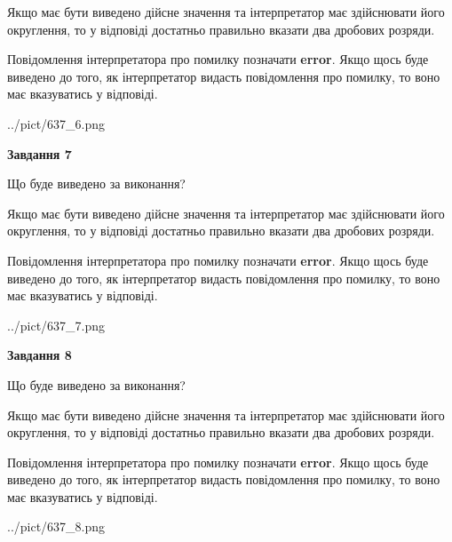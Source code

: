 \documentclass[12pt, ukrainian]{article}
\begin{document}
{\begin {Large}
Якщо має бути виведено дійсне значення та інтерпретатор має здійснювати його округлення, 
то у відповіді достатньо правильно вказати два дробових розряди.

Повідомлення інтерпретатора про помилку позначати \textbf{error}.
Якщо щось буде виведено до того, як інтерпретатор видасть повідомлення про помилку, 
то воно має вказуватись у відповіді. \par

\begin{center}
	{../pict/637_6.png}
\end{center}
\newpage

{\begin {center}\textbf{Завдання 7}\end {center}}\par
Що буде виведено за виконання? \par

Якщо має бути виведено дійсне значення та інтерпретатор має здійснювати його округлення, 
то у відповіді достатньо правильно вказати два дробових розряди.

Повідомлення інтерпретатора про помилку позначати \textbf{error}.
Якщо щось буде виведено до того, як інтерпретатор видасть повідомлення про помилку, 
то воно має вказуватись у відповіді. \par

\begin{center}
	{../pict/637_7.png}
\end{center}
\newpage

{\begin {center}\textbf{Завдання 8}\end {center}}\par
Що буде виведено за виконання? \par

Якщо має бути виведено дійсне значення та інтерпретатор має здійснювати його округлення, 
то у відповіді достатньо правильно вказати два дробових розряди.

Повідомлення інтерпретатора про помилку позначати \textbf{error}.
Якщо щось буде виведено до того, як інтерпретатор видасть повідомлення про помилку, 
то воно має вказуватись у відповіді. \par

\begin{center}
	{../pict/637_8.png}
\end{center}
\newpage


\end{Large}}
\end{document}
